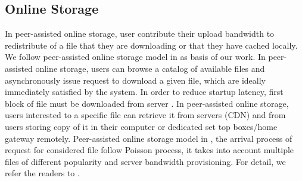 \documentclass[JIP]{ipsj}
\begin{document}
\subsection{Online Storage}
%


In peer-assisted online storage, user contribute their upload bandwidth to redistribute of a file that they are downloading or that they have cached locally.
We follow peer-assisted online storage model in \cite{Sun:2009:POS:1542245.1542249} as basis of our work. 
In peer-assisted online storage, users can browse a catalog of available files and asynchronously issue request to download a given file, which are ideally immediately satisfied by the system.
In order to reduce startup latency, first block of file must be downloaded from server \cite{5199550}.
In peer-assisted online storage, users interested to a specific file can retrieve it from servers (CDN) and from users storing copy of it in their computer or dedicated set top boxes/home gateway remotely.  
Peer-assisted online storage model in \cite{Sun:2009:POS:1542245.1542249}, the arrival process of request for considered file follow Poisson process, it takes into account multiple files of different popularity and server bandwidth provisioning.
For detail, we refer the readers to \cite{Sun:2009:POS:1542245.1542249,5199550,5061997}.
\end{document}
